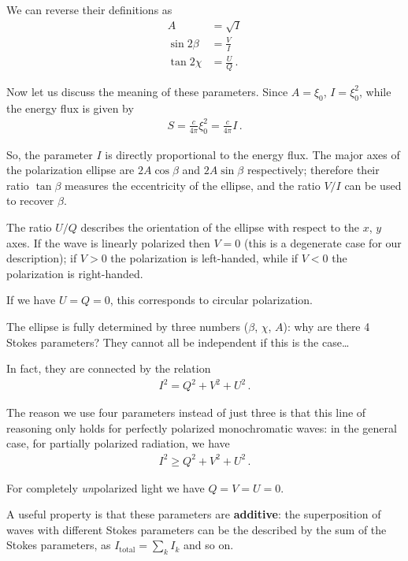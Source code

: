 \documentclass[main.tex]{subfiles}
\begin{document}
We can reverse their definitions as 
%
\begin{align}
A &= \sqrt{I}  \\
\sin 2 \beta &= \frac{V}{I} \\
\tan 2 \chi &= \frac{U}{Q}
\,.
\end{align}

Now let us discuss the meaning of these parameters. Since \(A = \xi_0 \), \(I = \xi_0^2\), while the energy flux is given by 
%
\begin{align}
S = \frac{c}{4 \pi } \xi_0^2 = \frac{c}{4 \pi } I
\,.
\end{align}

So, the parameter \(I\) is directly proportional to the energy flux.
The major axes of the polarization ellipse are \(2A \cos \beta \) and \(2 A \sin \beta \) respectively; therefore their ratio \(\tan \beta \) measures the eccentricity of the ellipse, and the ratio \(V/I\) can be used to recover \(\beta \).

The ratio \(U/Q\) describes the orientation  of the ellipse with respect to the \(x\), \(y\) axes.
If the wave is linearly polarized then  \(V =0 \) (this is a degenerate case for our description); if \(V > 0\) the polarization  is left-handed, while if \(V< 0\) the polarization is right-handed.

If we have \(U = Q = 0\), this corresponds to circular polarization. 

The ellipse is fully determined by three numbers (\(\beta \), \(\chi \), \(A\)): why are there 4 Stokes parameters? They cannot all be independent if this is the case\dots  

In fact, they are connected by the relation 
%
\begin{align}
I^2= Q^2 + V^2+ U^2
\,.
\end{align}

The reason we use four parameters instead of just three is that this line of reasoning only holds for perfectly polarized monochromatic waves: in the general case, for partially polarized radiation, we have 
%
\begin{align}
I^2 \geq Q^2 + V^2 + U^2
\,.
\end{align}

For completely \emph{un}polarized light we have \(Q = V = U = 0\). 

A useful property is that these parameters are \textbf{additive}: the superposition of waves with different Stokes parameters can be the described by the sum of the Stokes parameters, as \(I _{\text{total}} = \sum _{k} I_k\) and so on. 
\end{document}
